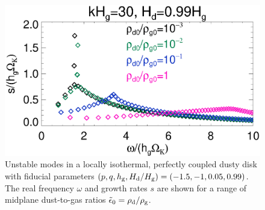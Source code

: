 \begin{figure}
  \includegraphics[width=\linewidth]{figures/compare_eigenvals_kx30Hd1} 
  \caption{Unstable modes in a locally isothermal, perfectly coupled
    dusty disk with fiducial parameters
    $(p,q,h_\mathrm{g}, H_\mathrm{d}/H_\mathrm{g} )=(-1.5,-1,0.05, 0.99)$. The real
    frequency $\omega$ and growth rates $s$ are shown for a range of
    midplane dust-to-gas ratios $\tilde{\epsilon}_0=\rho_\mathrm{d}/\rho_\mathrm{g}$. 
    \label{vsi_dust_loading}
    }
\end{figure}


